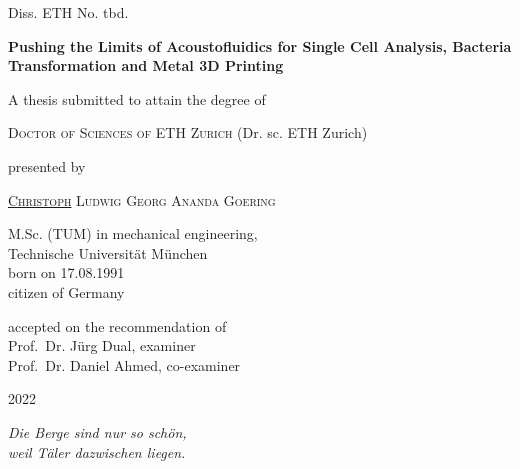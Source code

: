 \begin{titlepage}
{Diss. ETH No. tbd. \vspace{2.5cm}}
\begin{center}
\large{\textbf{Pushing the Limits of Acoustofluidics for Single Cell Analysis, 
Bacteria Transformation and Metal 3D Printing}}
\end{center}
\vspace{2.0cm}
\begin{center}
{A thesis submitted to attain the degree of}
\end{center}
\begin{center}
{\textsc{Doctor of Sciences of ETH Zurich}}
{(Dr. sc. ETH Zurich)}
\end{center}
\vspace{10mm}
\begin{center}
{presented by}
\end{center}
\begin{center}
  {\textsc{\underline{Christoph} Ludwig Georg Ananda Goering}}
\end{center}
\begin{center}
{M.Sc. (TUM) in mechanical engineering,\\
Technische Universit\"at M\"unchen\\
born on 17.08.1991 \\
citizen of Germany}
\end{center}
\vspace{10mm}
\begin{center}
{accepted on the recommendation of \\ \vspace{0.3cm}
Prof.\ Dr. J\"urg Dual, examiner \\
Prof.\ Dr. Daniel Ahmed, co-examiner}
\end{center}
\vspace{5mm}
\begin{center}
2022
\end{center}

\cleardoublepage
\thispagestyle{empty}
\vspace*{5.0cm}

\begin{center}
\vspace*{0.5cm}
\Large
\textit{Die Berge sind nur so schön,\\ weil Täler dazwischen liegen.}



\end{center}


\cleardoublepage
\end{titlepage}
